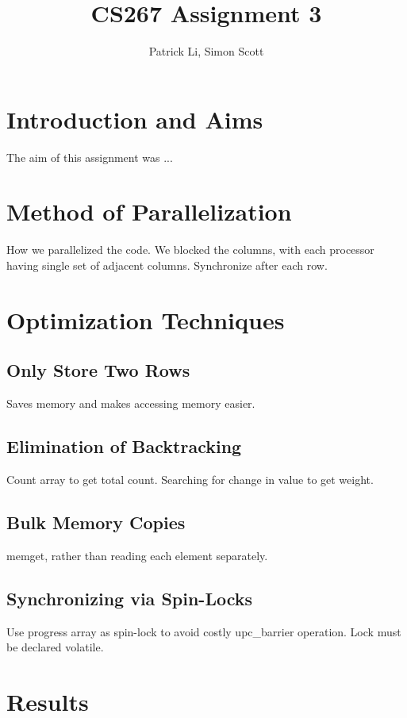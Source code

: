 \documentclass[11pt]{article} %
\title{CS267 Assignment 3}
\author{Patrick Li, Simon Scott}
\begin{document}
\maketitle
\parskip 7.2pt

\section{Introduction and Aims}

The aim of this assignment was ...

\section{Method of Parallelization}

How we parallelized the code. We blocked the columns, with each processor having single set of adjacent columns. Synchronize after each row.

\section{Optimization Techniques}

\subsection{Only Store Two Rows}

Saves memory and makes accessing memory easier.

\subsection{Elimination of Backtracking}

Count array to get total count.
Searching for change in value to get weight.

\subsection{Bulk Memory Copies}

memget, rather than reading each element separately.

\subsection{Synchronizing via Spin-Locks}

Use progress array as spin-lock to avoid costly upc\_barrier operation. Lock must be declared volatile.

\section{Results}
\end{document}
